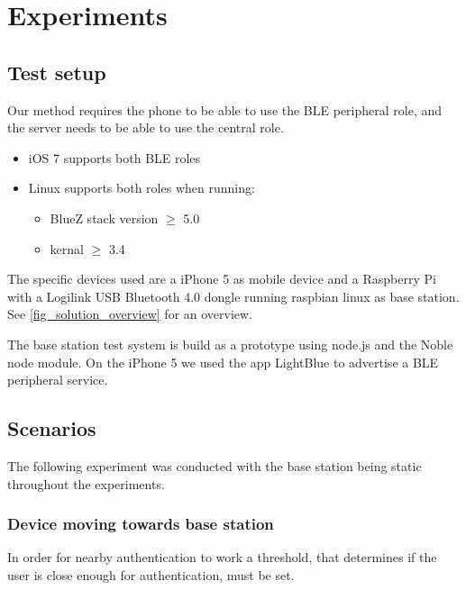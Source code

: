 \section{Experiments}

\subsection{Test setup}

Our method requires the phone to be able to use the BLE peripheral role, and the server needs to be able to use the central role.
\begin{itemize}
	\item iOS 7 supports both BLE roles
	\item Linux supports both roles when running:
	\begin{itemize}
		\item BlueZ stack version $\geq$ 5.0
		\item kernal $\geq$ 3.4 
	\end{itemize}
\end{itemize}
%
The specific devices used are a iPhone 5 as mobile device and a Raspberry Pi with a Logilink USB Bluetooth 4.0 dongle running raspbian linux as base station. See \cref{fig_solution_overview} for an overview.

The base station test system is build as a prototype using node.js and the Noble node module.
On the iPhone 5 we used the app LightBlue to advertise a BLE peripheral service.


\subsection{Scenarios}

The following experiment was conducted with the base station being static throughout the experiments.


\subsubsection{Device moving towards base station}
\label{section:MovingTowardsSystem}
In order for nearby authentication to work a threshold, that determines if the user is close enough for authentication, must be set.

